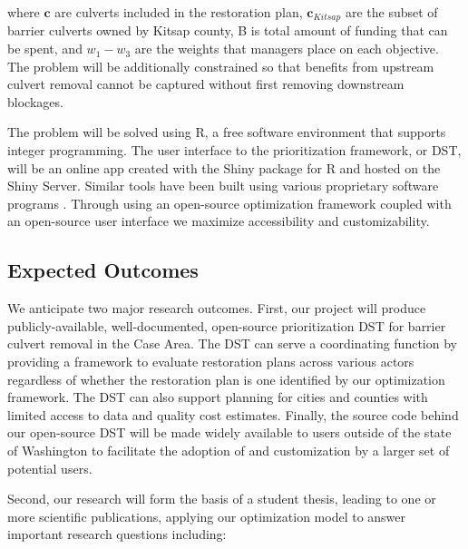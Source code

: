\documentclass[12pt]{elsarticle}
\begin{document}
	
	where $\boldsymbol{c}$ are culverts included in the restoration plan, $\boldsymbol{c}_{Kitsap}$ are the subset of barrier culverts owned by Kitsap county, B is total amount of funding that can be spent, and $w_1-w_3$ are the weights that managers place on each objective. The problem will be additionally constrained so that benefits from upstream culvert removal cannot be captured without first removing downstream blockages.
	
	The problem will be solved using R, a free software environment that supports integer programming. The user interface to the prioritization framework, or DST, will be an online app created with the Shiny package for R and hosted on the Shiny Server. Similar tools have been built using various proprietary software programs \citep{ohanley_optipass_2015, moody_pet_2017, mcmanamay_commonalities_2019}. Through using an open-source optimization framework coupled with an open-source user interface we maximize accessibility and customizability.  
	
	\subsection{Expected Outcomes} %
	
	We anticipate two major research outcomes. First, our project will produce publicly-available, well-documented, open-source prioritization DST for barrier culvert removal in the Case Area. The DST can serve a coordinating function by providing a framework to evaluate restoration plans across various actors regardless of whether the restoration plan is one identified by our optimization framework. The DST can also support planning for cities and counties with limited access to data and quality cost estimates. Finally, the source code behind our open-source DST will be made widely available to users outside of the state of Washington to facilitate the adoption of and customization by a larger set of potential users. 
	
	Second, our research will form the basis of a student thesis, leading to one or more scientific publications, applying our optimization model to answer important research questions including:
	
\end{document}
